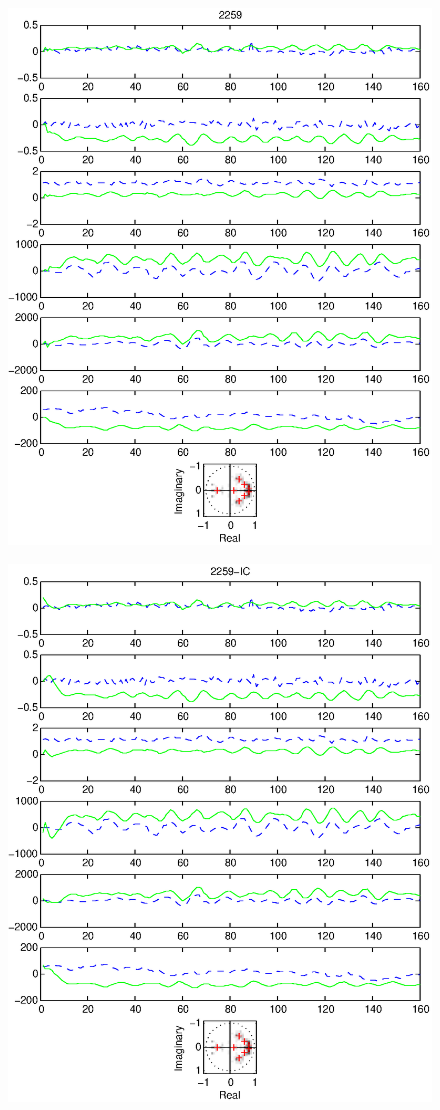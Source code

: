 \documentclass{article}
\begin{document}
\begin{figure}[htb!]\centering
\includegraphics{2259.eps}
\end{figure}\clearpage
\begin{figure}[htb!]\centering
\includegraphics{2259_ic.eps}
\end{figure}\clearpage
\end{document}
